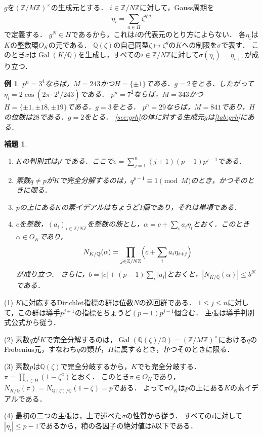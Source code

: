 \documentclass[11pt,a4paper]{ltjsarticle}
\makeatletter
\theoremstyle{ja}
\newtheorem{lemma}[theorem]{補題}
\newtheorem{example}[theorem]{例}
\renewenvironment{proof}[1][証明]{\par
  \pushQED{\qed}\normalfont \topsep6\p@\@plus6\p@\relax
  \trivlist
  \item[\hskip\labelsep\bfseries #1]\hspace{1\zw}\ignorespaces
}{\popQED\endtrivlist\@endpefalse}
\makeatother
\begin{document}
$g$を$(\mathbb{Z}/M\mathbb{Z})^\times$の生成元とする．
$i \in \mathbb{Z}/N\mathbb{Z}$に対して，Gauss周期を
\[
\eta_i = \sum_{a \in H} \zeta^{g^i a}
\]
で定義する．
$g^N \in H$であるから，これは$i$の代表元のとり方によらない．
各$\eta_i$は$K$の整数環$O_K$の元である．
$\mathbb{Q}(\zeta)$の自己同型$\zeta \mapsto \zeta^g$の$K$への制限を$\sigma$で表す．
このとき$\sigma$は$\operatorname{Gal}(K/\mathbb{Q})$を生成し，すべての$i \in \mathbb{Z}/N\mathbb{Z}$に対して$\sigma(\eta_i) = \eta_{i+1}$が成り立つ．

\begin{example} \label{ex:fields}
$p^n = 3^4$ならば，$M = 243$かつ$H = \{\pm 1\}$である．$g = 2$をとる．したがって$\eta_i = 2\cos(2\pi \cdot 2^i/243)$である．
$p^n = 7^2$ならば，$M = 343$かつ$H = \{\pm 1, \pm 18, \pm 19\}$である．$g = 3$をとる．
$p^n = 29$ならば，$M = 841$であり，$H$の位数は$28$である．$g = 2$をとる．
\cref{sec:grh}の体に対する生成元$g$は\cref{tab:grh}にある．
\end{example}

\begin{lemma} \label{lem:field}
\begin{enumerate}
\item $K$の判別式は$p^e$である．ここで$e = \sum_{j=1}^{n} (j+1)(p-1)p^{j-1}$である．
\item 素数$q \ne p$が$K$で完全分解するのは，$q^{p-1} \equiv 1 \pmod{M}$のとき，かつそのときに限る．
\item $p$の上にある$K$の素イデアルはちょうど1個であり，それは単項である．
\item $c$を整数，$(a_i)_{i \in \mathbb{Z}/N\mathbb{Z}}$を整数の族とし，$\alpha = c + \sum_i a_i \eta_i$とおく．このとき$\alpha \in O_K$であり，
\[
N_{K/\mathbb{Q}}(\alpha) = \prod_{j \in \mathbb{Z}/N\mathbb{Z}} \Bigl( c + \sum_{i} a_i \eta_{i+j} \Bigr)
\]
が成り立つ．
さらに，$b = |c| + (p-1) \sum_i |a_i|$とおくと，$|N_{K/\mathbb{Q}}(\alpha)| \le b^N$である．
\end{enumerate}
\end{lemma}

\begin{proof}
(1) $K$に対応するDirichlet指標の群は位数$N$の巡回群である．
$1 \le j \le n$に対して，この群は導手$p^{j+1}$の指標をちょうど$(p-1)p^{j-1}$個含む．
主張は導手判別式公式から従う．

(2) 素数$q$が$K$で完全分解するのは，$\operatorname{Gal}(\mathbb{Q}(\zeta)/\mathbb{Q}) = (\mathbb{Z}/M\mathbb{Z})^\times$における$q$のFrobenius元，すなわち$q$の類が，$H$に属するとき，かつそのときに限る．

(3) 素数$p$は$\mathbb{Q}(\zeta)$で完全分岐するから，$K$でも完全分岐する．
$\pi = \prod_{a \in H} (1 - \zeta^a)$とおく．
このとき$\pi \in O_K$であり，$N_{K/\mathbb{Q}}(\pi) = N_{\mathbb{Q}(\zeta)/\mathbb{Q}}(1 - \zeta) = p$である．
よって$\pi O_K$は$p$の上にある$K$の素イデアルである．

(4) 最初の二つの主張は，上で述べた$\sigma$の性質から従う．
すべての$i$に対して$|\eta_i| \le p - 1$であるから，積の各因子の絶対値は$b$以下である．
\end{proof}
\end{document}
